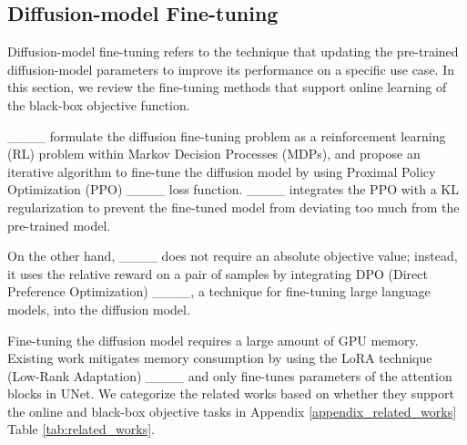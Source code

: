 
\subsection{Diffusion-model Fine-tuning}
Diffusion-model fine-tuning refers to the technique that updating the pre-trained diffusion-model parameters to improve its performance on a specific use case. In this section, we review the fine-tuning methods that support online learning of the black-box objective function.

____ formulate the diffusion fine-tuning problem as a reinforcement learning (RL) problem within Markov Decision Processes (MDPs), and propose an iterative algorithm to fine-tune the diffusion model by using Proximal Policy Optimization (PPO) ____ loss function. ____ integrates the PPO with a KL regularization to prevent the fine-tuned model from deviating too much from the pre-trained model. 

On the other hand, ____ does not require an absolute objective value; instead, it uses the relative reward on a pair of samples by integrating DPO (Direct Preference Optimization) ____, a technique for fine-tuning large language models, into the diffusion model.

Fine-tuning the diffusion model requires a large amount of GPU memory. Existing work mitigates memory consumption by using the LoRA technique (Low-Rank Adaptation) ____ and only fine-tunes parameters of the attention blocks in UNet. We categorize the related works based on whether they support the online and black-box objective tasks in Appendix \ref{appendix_related_works} Table \ref{tab:related_works}.